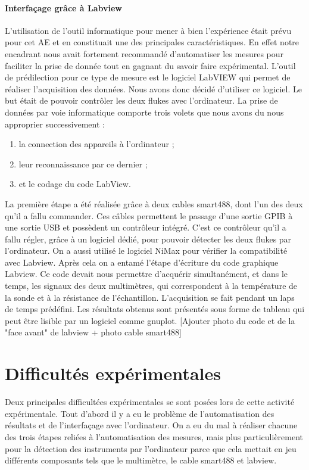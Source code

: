 \paragraph*{Interfaçage grâce à Labview}
L'utilisation de l'outil informatique pour mener à bien l'expérience était prévu pour cet AE 
et en constituait une des principales caractéristiques. En effet notre encadrant nous avait fortement recommandé 
d'automatiser les mesures pour faciliter la prise de donnée tout en gagnant du savoir faire expérimental. L'outil de 
prédilection pour ce type de mesure est le logiciel LabVIEW qui permet de réaliser l'acquisition des données. 
Nous avons donc décidé d'utiliser ce logiciel. Le but était de pouvoir contrôler les deux flukes avec l'ordinateur. 
La prise de données par voie informatique comporte trois volets que nous avons du nous approprier successivement : 
\begin{enumerate}
\item la connection des appareils à l'ordinateur ; 
\item leur reconnaissance par ce dernier ; 
\item et le codage du code LabView. 
\end{enumerate}
La première étape a été réalisée grâce à deux cables smart488, dont l'un des deux qu'il a fallu commander. 
Ces câbles permettent le passage d'une sortie GPIB à une sortie USB et possèdent un contrôleur intégré. 
C'est ce contrôleur qu'il a fallu régler, grâce à un logiciel dédié, pour pouvoir détecter les deux flukes 
par l'ordinateur. On a aussi utilisé le logiciel NiMax pour vérifier la compatibilité avec Labview. 
Après cela on a entamé l'étape d'écriture du code graphique Labview. Ce code devait nous permettre d'acquérir 
simultanément, et dans le temps, les signaux des deux multimètres, qui correspondent à la température de la sonde 
et à la résistance de l'échantillon. L'acquisition se fait pendant un laps de temps prédéfini. Les résultats obtenus sont présentés sous forme de tableau qui peut être lisible par un logiciel comme gnuplot.
[Ajouter photo du code et de la "face avant" de labview + photo cable smart488]


\section*{Difficultés expérimentales}
Deux principales difficultées expérimentales se sont posées lors de cette activité expérimentale. 
Tout d'abord il y a eu le problème de l'automatisation des résultats et de l'interfaçage avec l'ordinateur.
On a eu du mal à réaliser chacune des trois étapes reliées à l'automatisation des mesures, mais plus particulièrement 
pour la détection des instruments par l'ordinateur parce que cela mettait en jeu différents composants tels que le 
multimètre, le cable smart488 et labview.

